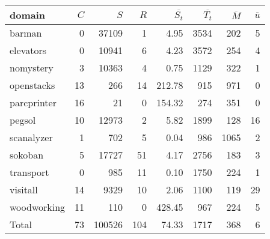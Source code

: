\begin{table}[htbp]
\centering
\begingroup\small
\begin{tabular}{lrrrrrrr}
  \hline
domain & $C$ & $S$ & $R$ & $\overline{S_t}$ & $\overline{T_t}$ & $\overline{M}$ & $\overline{u}$ \\ 
  \hline
barman &   0 & 37109 &   1 & 4.95 & 3534 & 202 &   5 \\ 
  elevators &   0 & 10941 &   6 & 4.23 & 3572 & 254 &   4 \\ 
  nomystery &   3 & 10363 &   4 & 0.75 & 1129 & 322 &   1 \\ 
  openstacks &  13 & 266 &  14 & 212.78 & 915 & 971 &   0 \\ 
  parcprinter &  16 &  21 &   0 & 154.32 & 274 & 351 &   0 \\ 
  pegsol &  10 & 12973 &   2 & 5.82 & 1899 & 128 &  16 \\ 
  scanalyzer &   1 & 702 &   5 & 0.04 & 986 & 1065 &   2 \\ 
  sokoban &   5 & 17727 &  51 & 4.17 & 2756 & 183 &   3 \\ 
  transport &   0 & 985 &  11 & 0.10 & 1750 & 224 &   1 \\ 
  visitall &  14 & 9329 &  10 & 2.06 & 1100 & 119 &  29 \\ 
  woodworking &  11 & 110 &   0 & 428.45 & 967 & 224 &   5 \\ 
  Total &  73 & 100526 & 104 & 74.33 & 1717 & 368 &   6 \\ 
   \hline
\end{tabular}
\endgroup
\caption{\oursolver{}} 
\label{tab:our}
\end{table}
